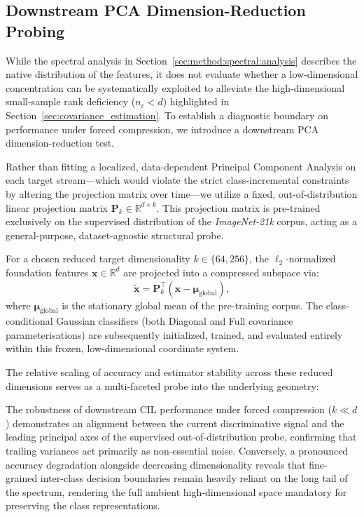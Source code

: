 \subsection{Downstream PCA Dimension-Reduction Probing}
\label{sec:method:spectral:pca_test}

While the spectral analysis in Section~\ref{sec:method:spectral:analysis} describes the native distribution of the features, it does not evaluate whether a low-dimensional concentration can be systematically exploited to alleviate the high-dimensional small-sample rank deficiency ($n_c < d$) highlighted in Section~\ref{sec:covariance_estimation}. To establish a diagnostic boundary on performance under forced compression, we introduce a downstream PCA dimension-reduction test.

Rather than fitting a localized, data-dependent Principal Component Analysis on each target stream---which would violate the strict class-incremental constraints by altering the projection matrix over time---we utilize a fixed, out-of-distribution linear projection matrix $\mathbf{P}_k \in \mathbb{R}^{d \times k}$. This projection matrix is pre-trained exclusively on the supervised distribution of the \emph{ImageNet-21k} corpus, acting as a general-purpose, dataset-agnostic structural probe. 

For a chosen reduced target dimensionality $k \in \{64, 256\}$, the $\ell_2$-normalized foundation features $\mathbf{x} \in \mathbb{R}^d$ are projected into a compressed subspace via:
\begin{equation}
	\tilde{\mathbf{x}} = \mathbf{P}_k^{\top} (\mathbf{x} - \boldsymbol{\mu}_{\text{global}}),
	\label{eq:pca_projection}
\end{equation}
where $\boldsymbol{\mu}_{\text{global}}$ is the stationary global mean of the pre-training corpus. The class-conditional Gaussian classifiers (both Diagonal and Full covariance parameterisations) are subsequently initialized, trained, and evaluated entirely within this frozen, low-dimensional coordinate system. 

The relative scaling of accuracy and estimator stability across these reduced dimensions serves as a multi-faceted probe into the underlying geometry:

The robustness of downstream CIL performance under forced compression ($k \ll d$) demonstrates an alignment between the current discriminative signal and the leading principal axes of the supervised out-of-distribution probe, confirming that trailing variances act primarily as non-essential noise. Conversely, a pronounced accuracy degradation alongside decreasing dimensionality reveals that fine-grained inter-class decision boundaries remain heavily reliant on the long tail of the spectrum, rendering the full ambient high-dimensional space mandatory for preserving the class representations.


